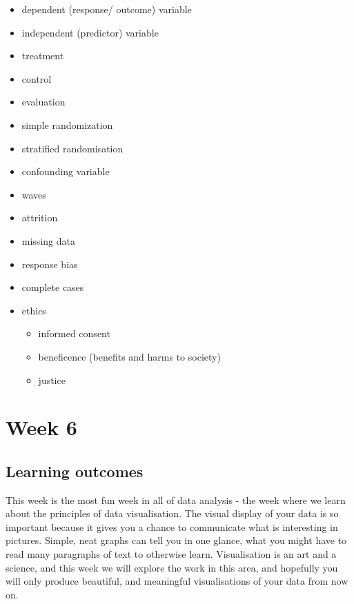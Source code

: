 \documentclass[]{book}
\providecommand{\tightlist}{%
  \setlength{\itemsep}{0pt}\setlength{\parskip}{0pt}}
\theoremstyle{definition}
\theoremstyle{definition}
\theoremstyle{definition}
\theoremstyle{remark}
\begin{document}
\begin{itemize}
\tightlist
\item
  dependent (response/ outcome) variable
\item
  independent (predictor) variable
\item
  treatment
\item
  control
\item
  evaluation
\item
  simple randomization
\item
  stratified randomisation
\item
  confounding variable
\item
  waves
\item
  attrition
\item
  missing data
\item
  response bias
\item
  complete cases
\item
  ethics

  \begin{itemize}
  \tightlist
  \item
    informed consent
  \item
    beneficence (benefits and harms to society)
  \item
    justice
  \end{itemize}
\end{itemize}

\hypertarget{week6}{%
\chapter{Week 6}\label{week6}}

\hypertarget{learning-outcomes-5}{%
\section{Learning outcomes}\label{learning-outcomes-5}}

This week is the most fun week in all of data analysis - the week where
we learn about the principles of data visualisation. The visual display
of your data is so important because it gives you a chance to
communicate what is interesting in pictures. Simple, neat graphs can
tell you in one glance, what you might have to read many paragraphs of
text to otherwise learn. Visualisation is an art and a science, and this
week we will explore the work in this area, and hopefully you will only
produce beautiful, and meaningful visualisations of your data from now
on.
\end{document}
